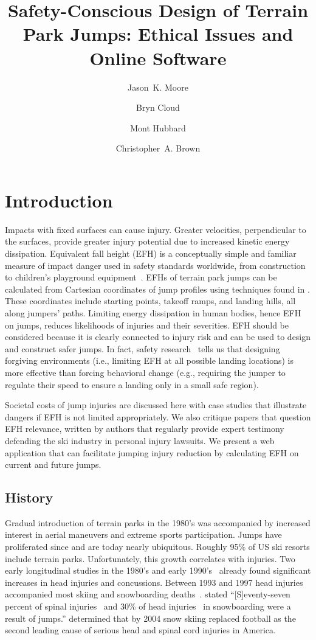 \documentclass[fleqn,10pt,lineno]{wlpeerj}
\title{Safety-Conscious Design of Terrain Park Jumps: Ethical Issues and Online
Software}
\author[1]{Jason~K. Moore}
\author[2]{Bryn Cloud}
\author[2]{Mont Hubbard}
\author[3]{Christopher~A. Brown}
\affil[1]{Delft University of Technology\\Mekelweg 2, 2628 CD Delft, The Netherlands}
\affil[2]{University of California, Davis\\One Shields Ave., Davis, CA 95616 USA}
\affil[3]{Worcester Polytechnic Institute\\100 Institute Rd., Worcester, MA 01609 USA}
\begin{document}
\flushbottom
\maketitle
\thispagestyle{empty}

\section*{Introduction}
\label{intro}
%
Impacts with fixed surfaces can cause injury. Greater velocities, perpendicular
to the surfaces, provide greater injury potential due to increased kinetic
energy dissipation. Equivalent fall height (EFH) is a conceptually simple and
familiar measure of impact danger used in safety standards worldwide, from
construction~\citep{OSHA2021} to children's playground
equipment~\citep{Chalmers1996}. EFHs of terrain park jumps can be calculated
from Cartesian coordinates of jump profiles using techniques found in
\cite{Levy2015}. These coordinates include starting points, takeoff ramps, and
landing hills, all along jumpers' paths. Limiting energy dissipation in human
bodies, hence EFH on jumps, reduces likelihoods of injuries and their
severities. EFH should be considered because it is clearly connected to injury
risk and can be used to design and construct safer jumps. In fact, safety
research~\citep{Smith2020} tells us that designing forgiving environments
(i.e., limiting EFH at all possible landing locations) is more effective than
forcing behavioral change (e.g., requiring the jumper to regulate their speed
to ensure a landing only in a small safe region).

Societal costs of jump injuries are discussed here with case studies that
illustrate dangers if EFH is not limited appropriately. We also critique papers
that question EFH relevance, written by authors that regularly provide expert
testimony defending the ski industry in personal injury lawsuits. We present a
web application that can facilitate jumping injury reduction by calculating EFH
on current and future jumps.

\subsection*{History}
\label{sec:hist}
%
Gradual introduction of terrain parks in the 1980's was accompanied by
increased interest in aerial maneuvers and extreme sports participation. Jumps
have proliferated since and are today nearly ubiquitous.  Roughly 95\% of US
ski resorts include terrain parks. Unfortunately, this growth correlates with
injuries. Two early longitudinal studies in the 1980's and early
1990's~\citep{Deibert1998,Furrer1995} already found significant increases in
head injuries and concussions. Between 1993 and 1997 head injuries accompanied
most skiing and snowboarding deaths~\citep{CPSC1999}. \cite{Koehle2002} stated
``[S]eventy-seven percent of spinal injuries~\citep{Tarazi1999} and 30\% of
head injuries~\citep{Fukuda2001} in snowboarding were a result of jumps.''
\cite{Jackson2004} determined that by 2004 snow skiing replaced football as the
second leading cause of serious head and spinal cord injuries in America.
\end{document}
